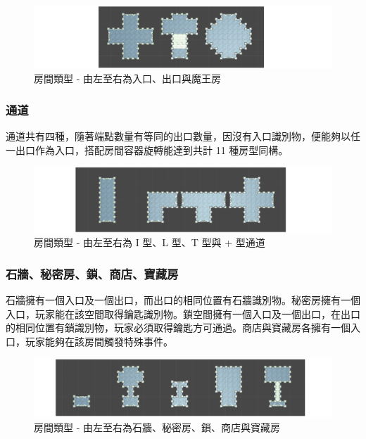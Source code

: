 \begin{figure}[ht]
  \begin{center}
    \includegraphics[width=1.0\textwidth]{figures/roomtype-mainpath-i.png}
    \caption{房間類型 - 由左至右為入口、出口與魔王房}
    \label{fig:roomtype-mainpath-i}
  \end{center}
\end{figure}

\subsubsection{通道}
\label{sssec:method-spacepieces-types-path}

通道共有四種，隨著端點數量有等同的出口數量，因沒有入口識別物，便能夠以任一出口作為入口，搭配房間容器旋轉能達到共計 11 種房型同構。

\begin{figure}[ht]
  \begin{center}
    \includegraphics[width=1.0\textwidth]{figures/roomtype-mainpath-ii.png}
    \caption{房間類型 - 由左至右為 I 型、L 型、T 型與 + 型通道}
    \label{fig:roomtype-mainpath-ii}
  \end{center}
\end{figure}

\subsubsection{石牆、秘密房、鎖、商店、寶藏房}
\label{sssec:method-spacepieces-types-special}

石牆擁有一個入口及一個出口，而出口的相同位置有石牆識別物。秘密房擁有一個入口，玩家能在該空間取得鑰匙識別物。鎖空間擁有一個入口及一個出口，在出口的相同位置有鎖識別物，玩家必須取得鑰匙方可通過。商店與寶藏房各擁有一個入口，玩家能夠在該房間觸發特殊事件。

\begin{figure}[ht]
  \begin{center}
    \includegraphics[width=1.0\textwidth]{figures/roomtype-special.png}
    \caption{房間類型 - 由左至右為石牆、秘密房、鎖、商店與寶藏房}
    \label{fig:roomtype-special}
  \end{center}
\end{figure}

